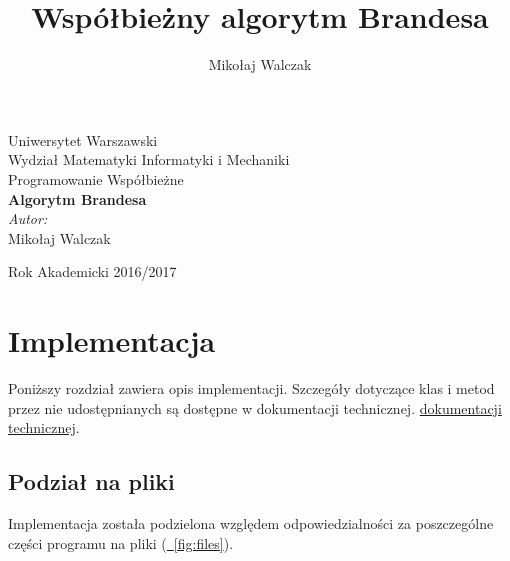 \documentclass{article}
\title{\textbf{Współbieżny algorytm Brandesa}}
\author{Mikołaj Walczak}
\date{\vspace{-5ex}}
\begin{document}
  \newcommand{\HRule}{\rule{\linewidth}{0.5mm}} %
  \begin{titlepage}
    \center
    \LARGE Uniwersytet Warszawski\\[0.1cm]
    \Large Wydział Matematyki Informatyki i Mechaniki\\[0.5cm] %
    \large Programowanie Współbieżne\\[6.1cm] %
    { \huge \bfseries Algorytm Brandesa}\\[0.5cm] %
    \large \emph{Autor:}\\ Mikołaj Walczak \\
    \vspace{\fill}
    \begin{minipage}[b]{\textwidth}
        \centering
        \large Rok Akademicki 2016/2017

        \vspace{-20mm}
    \end{minipage}%
  \end{titlepage}

  \tableofcontents
  {%
  \let\oldnumberline\numberline%
  \renewcommand{\numberline}{\figurename~\oldnumberline}%
  \listoffigures%
  }
  {%
  \let\oldnumberline\numberline%
  \renewcommand{\numberline}{\tablename~\oldnumberline}%
  \listoftables%
  }
  \newpage

  \section{Implementacja}
    Poniższy rozdział zawiera opis implementacji. Szczegóły dotyczące klas i
    metod przez nie udostępnianych są dostępne w dokumentacji technicznej.
    \hyperref[documentation]{dokumentacji technicznej}.
    \label{implementation}
    \subsection{Podział na pliki}
      \label{files}
      Implementacja została podzielona względem odpowiedzialności za poszczególne
      części programu na pliki (\hyperref[fig:files]
      {\figurename~\ref*{fig:files}}).
\end{document}
